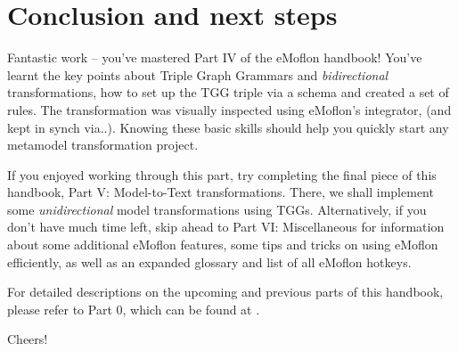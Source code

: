\section{Conclusion and next steps}
\genHeader

\vspace{0.5cm}

Fantastic work -- you've mastered Part IV of the eMoflon handbook! You've learnt the key points about Triple Graph Grammars and \emph{bidirectional}
transformations, how to set up the TGG triple via a schema and created a set of rules. The transformation was visually inspected using eMoflon's integrator,
(and kept in synch via..). Knowing these basic skills should help you quickly start any metamodel transformation project.

If you enjoyed working through this part, try completing the final piece of this handbook, Part V: Model-to-Text transformations. There, we shall implement some
\emph{unidirectional} model transformations using TGGs. Alternatively, if you don't have much time left, skip ahead to Part VI: Miscellaneous for information
about some additional eMoflon features, some tips and tricks on using eMoflon efficiently, as well as an expanded glossary and list of all eMoflon hotkeys.

For detailed descriptions on the upcoming and previous parts of this handbook, please refer to Part 0, which can be found at \dlPartZero.

Cheers!
